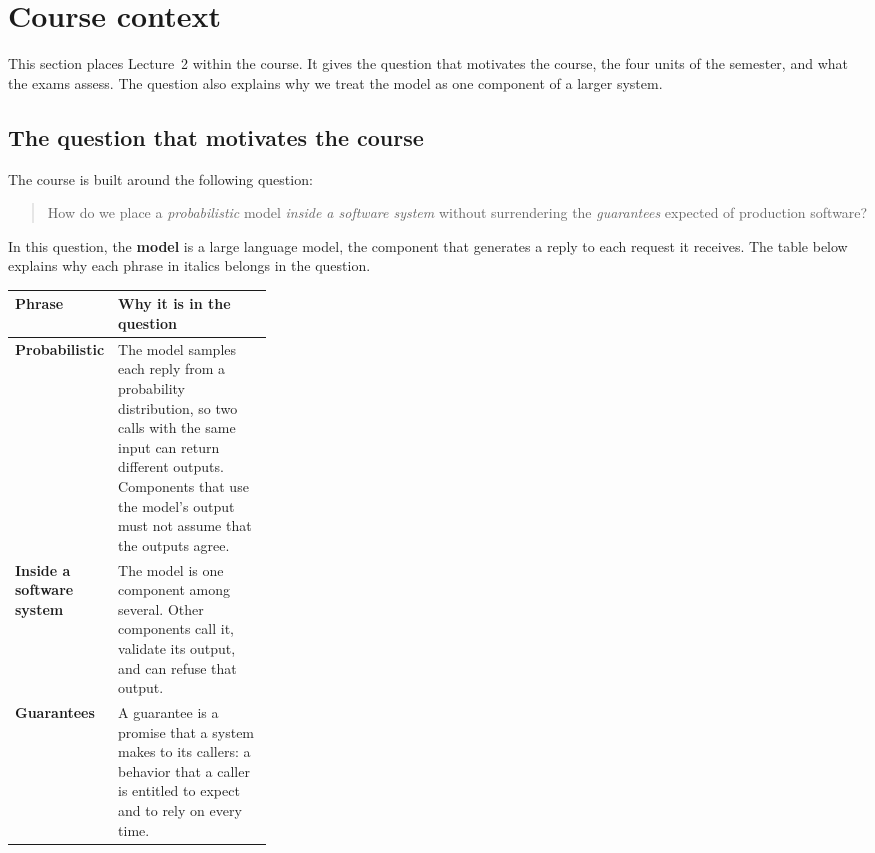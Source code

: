 \section*{Course context}
\makeatletter
\def\@currentlabel{Course context}\def\@currentlabelname{Course context}%
\def\cref@currentlabel{[context][1][]Course context}%
\makeatother
{}
\label{sec:logistics}

This section places Lecture~2 within the course. It gives the question that motivates the course,
the four units of the semester, and what the exams assess. The question also explains why we treat
the model as one component of a larger system.

\subsection*{The question that motivates the course}

The course is built around the following question:
\begin{quote}
How do we place a \emph{probabilistic} model \emph{inside a software system} without surrendering
the \emph{guarantees} expected of production software?
\end{quote}
In this question, the \textbf{model} is a large language model, the component that generates a
reply to each request it receives. The table below explains why each phrase in italics belongs in
the question.

\begin{center}
\begin{adjustbox}{width=\linewidth}\begin{tabularx}{\linewidth}{@{}L{0.3\linewidth}X@{}}
  \toprule
  \textbf{Phrase} & \textbf{Why it is in the question} \\
  \midrule
  \textbf{Probabilistic} & The model samples each reply from a probability distribution, so two
    calls with the same input can return different outputs. Components that use the model's output
    must not assume that the outputs agree. \\
  \addlinespace
  \textbf{Inside a software system} & The model is one component among several. Other components
    call it, validate its output, and can refuse that output. \\
  \addlinespace
  \textbf{Guarantees} & A guarantee is a promise that a system makes to its callers: a behavior
    that a caller is entitled to expect and to rely on every time. \\
  \bottomrule
\end{tabularx}\end{adjustbox}
\end{center}

